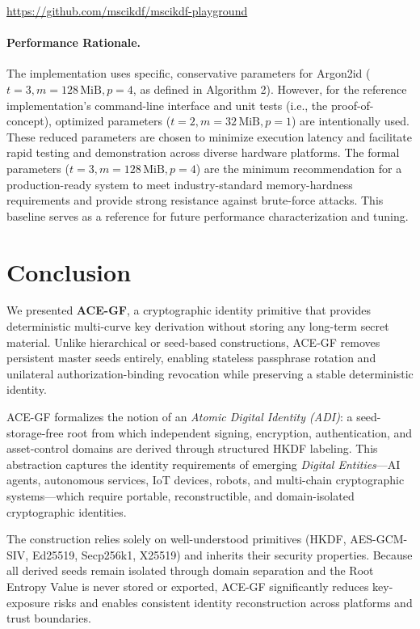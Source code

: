 \documentclass[12pt,a4paper]{article}
\begin{document}
\begin{center}
  \url{https://github.com/mscikdf/mscikdf-playground}
\end{center}

\paragraph{Performance Rationale.}
 The implementation uses specific, conservative parameters for Argon2id ($t=3, m=128\,\text{MiB}, p=4$, as defined in Algorithm 2). However, for the reference implementation's command-line interface and unit tests (i.e., the proof-of-concept), optimized parameters ($t=2, m=32\,\text{MiB}, p=1$) are intentionally used. These reduced parameters are chosen to minimize execution latency and facilitate rapid testing and demonstration across diverse hardware platforms. The formal parameters ($t=3, m=128\,\text{MiB}, p=4$) are the minimum recommendation for a production-ready system to meet industry-standard memory-hardness requirements and provide strong resistance against brute-force attacks. This baseline serves as a reference for future performance characterization and tuning.

  \section{Conclusion}

  We presented \textbf{ACE-GF}, a cryptographic identity primitive that
  provides deterministic multi-curve key derivation without storing any
  long-term secret material. Unlike hierarchical or seed-based constructions,
  ACE-GF removes persistent master seeds entirely, enabling stateless
  passphrase rotation and unilateral authorization-binding revocation while
  preserving a stable deterministic identity.

  ACE-GF formalizes the notion of an \emph{Atomic Digital Identity (ADI)}:
  a seed-storage-free root from which independent signing, encryption,
  authentication, and asset-control domains are derived through structured
  HKDF labeling. This abstraction captures the identity requirements of
  emerging \emph{Digital Entities}---AI agents, autonomous services, IoT
  devices, robots, and multi-chain cryptographic systems---which require
  portable, reconstructible, and domain-isolated cryptographic identities.

  The construction relies solely on well-understood primitives (HKDF,
  AES-GCM-SIV, Ed25519, Secp256k1, X25519) and inherits their security
  properties. Because all derived seeds remain isolated through domain
  separation and the Root Entropy Value is never stored or exported,
  ACE-GF significantly reduces key-exposure risks and enables consistent
  identity reconstruction across platforms and trust boundaries.
\end{document}
